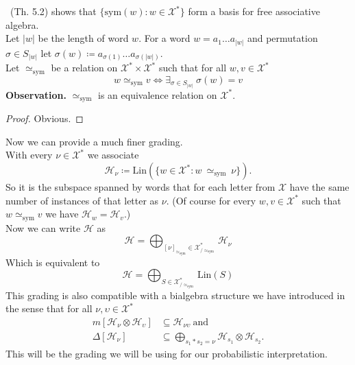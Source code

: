 \documentclass[a4paper, 12pt]{article}
\newcommand{\SimeqSym}{{\simeq_\mathrm{sym}}}
\begin{document}
~\cite{Garsia_auvancesin}(Th. 5.2) \label{basis}shows that $\{\mathrm{sym}(w) : w \in \mathcal{X^*}\}$ form a basis for free associative
algebra. \\
Let $|w|$ be the length of word $w$. For a word $w = a_1\dots a_{|w|}$ and permutation
$\sigma \in S_{|w|}$ let $\sigma(w) \coloneqq a_{\sigma(1)}\dots a_{\sigma(|w|)}$. \\
Let $\simeq_\mathrm{sym}$ be
a relation on $\mathcal{X}^* \times \mathcal{X}^*$ such that for all $w, v \in \mathcal{X}^*$
\begin{equation*}
w \simeq_\mathrm{sym} v \iff \exists_{\sigma \in S_{|w|}}\ \sigma(w) = v
\end{equation*}
\textbf{Observation.} $\simeq_\mathrm{sym}$ is an equivalence relation on $\mathcal{X}^*$.
\begin{proof}
Obvious.
\end{proof}
\noindent Now we can provide a much finer grading. \\
With every $\nu \in \mathcal{X}^*$ we associate
\begin{equation}
\mathcal{H}_\nu \coloneqq \mathrm{Lin}(\{w \in \mathcal{X}^* : w\ \SimeqSym\ \nu\}).
\end{equation}
So it is the subspace spanned by words that for each letter from $\mathcal{X}$ have the same number of
instances of that letter as
$\nu$. (Of course for every $w, v \in \mathcal{X}^*$ such that $w \SimeqSym v$ we have
$\mathcal{H}_w = \mathcal{H}_v$.) \\
Now we can write $\mathcal{H}$ as
\begin{equation*}
\mathcal{H} = \bigoplus_{{[\nu]}_\SimeqSym \in \mathcal{X}^*_{/\SimeqSym}} \mathcal{H}_\nu
\end{equation*}
Which is equivalent to
\begin{equation*}
\mathcal{H} = \bigoplus_{S \in \mathcal{X}^*_{/\SimeqSym}} \mathrm{Lin}(S)
\end{equation*}
This grading is also compatible with a bialgebra structure we have introduced in the sense that for all
$\nu, \upsilon \in \mathcal{X}^*$
\begin{align*}
m[\mathcal{H}_\nu \otimes \mathcal{H}_\upsilon] &\subseteq \mathcal{H}_{\nu\upsilon} \mathrm{\ and} \\
\Delta[\mathcal{H}_\nu] &\subseteq \bigoplus_{s_1*s_2=\nu}
\mathcal{H}_{s_1} \otimes \mathcal{H}_{s_2}.
\end{align*}
This will be the grading we will be using for our probabilistic interpretation.
\end{document}
